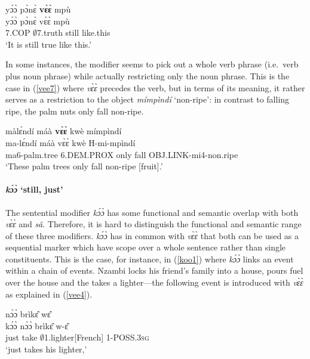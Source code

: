 \begin{exe} 
\ex\label{vee6}
  \glll yɔ́ɔ̀ pɔ̀nɛ̀ {\bfseries vɛ̀ɛ̀} mpù \\
        yɔ́ɔ̀ pɔ̀nɛ̀ vɛ̀ɛ̀ mpù \\
         7.COP $\emptyset$7.truth still like.this \\
    \trans `It is still true like this.'
\end{exe}

In some instances, the modifier seems to pick out a whole verb phrase (i.e.\ verb plus noun phrase) while actually restricting only the noun phrase. This is the case in (\ref{vee7}) where {\itshape vɛ̀ɛ̀} precedes the verb, but in terms of its meaning, it rather serves as a restriction to the object {\itshape mímpìndí} `non-ripe': in contrast to falling ripe, the palm nuts only fall non-ripe.


\begin{exe} 
\ex\label{vee7} 
  \glll  màlɛ́ndí máà {\bfseries vɛ̀ɛ̀} kwè mímpìndí \\
         ma-lɛ́ndí máà vɛ̀ɛ̀ kwè H-mi-mpìndí \\
           ma6-palm.tree 6.DEM.PROX only fall OBJ.LINK-mi4-non.ripe \\
    \trans `These palm trees only fall non-ripe [fruit].'
\end{exe}






\paragraph{{\itshape kɔ́ɔ̀} `still, just'}
The sentential modifier {\itshape kɔ́ɔ̀} has some functional and semantic overlap with both {\itshape vɛ̀ɛ̀} and {\itshape sâ}. Therefore, it is hard to distinguish the functional and semantic range of these three modifiers. {\itshape kɔ́ɔ̀} has in common with {\itshape vɛ̀ɛ̀} that both can be used as a sequential marker which have scope over a whole sentence rather than single constituents. This is the case, for instance, in (\ref{koo1}) where {\itshape kɔ́ɔ̀} links an event within a chain of events. Nzambi locks his friend's family into a house, pours fuel over the house and the takes a lighter---the following event is introduced with {\itshape vɛ̀ɛ̀} as explained in (\ref{vee4}).

\begin{exe} 
\ex\label{koo1}
   nɔ̀ɔ̀ brìkɛ̂ wɛ̂ \\
        kɔ́ɔ̀ nɔ̀ɔ̀ brìkɛ̂ w-ɛ̂ \\
      just take $\emptyset$1.lighter[French] 1-POSS.3\textsc{sg} \\
    \trans `just takes his lighter,'
\end{exe}

